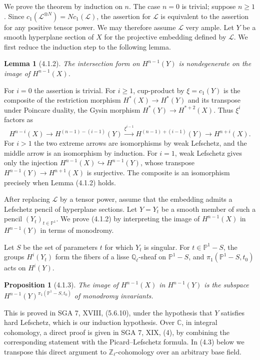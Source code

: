 \documentclass[11pt]{article}
\newtheorem{proposition}{Proposition}
\newtheorem{lemma}{Lemma}
\theoremstyle{remark}
\begin{document}
We prove the theorem by induction on $n$. The case $n=0$ is trivial; suppose $n\geq 1$. Since $c_1(\mathcal L^{\otimes N})=N c_1(\mathcal L)$, the assertion for $\mathcal L$ is equivalent to the assertion for any positive tensor power. We may therefore assume $\mathcal L$ very ample. Let $Y$ be a smooth hyperplane section of $X$ for the projective embedding defined by $\mathcal L$. We first reduce the induction step to the following lemma.

\begin{lemma}[4.1.2]
The intersection form on $H^{n-1}(Y)$ is nondegenerate on the image of $H^{n-1}(X)$.
\end{lemma}

For $i=0$ the assertion is trivial. For $i\geq 1$, cup-product by $\xi=c_1(Y)$ is the composite of the restriction morphism $H^*(X)\to H^*(Y)$ and its transpose under Poincare duality, the Gysin morphism $H^*(Y)\to H^{*+2}(X)$. Thus $\xi^i$ factors as
\[
H^{n-i}(X)\longrightarrow H^{(n-1)-(i-1)}(Y)
 \xrightarrow{\xi^{i-1}}
H^{(n-1)+(i-1)}(Y)\longrightarrow H^{n+i}(X).
\]
For $i>1$ the two extreme arrows are isomorphisms by weak Lefschetz, and the middle arrow is an isomorphism by induction. For $i=1$, weak Lefschetz gives only the injection $H^{n-1}(X)\hookrightarrow H^{n-1}(Y)$, whose transpose $H^{n-1}(Y)\to H^{n+1}(X)$ is surjective. The composite is an isomorphism precisely when Lemma (4.1.2) holds.

After replacing $\mathcal L$ by a tensor power, assume that the embedding admits a Lefschetz pencil of hyperplane sections. Let $Y=Y_t$ be a smooth member of such a pencil $(Y_t)_{t\in\mathbb P^1}$. We prove (4.1.2) by interpreting the image of $H^{n-1}(X)$ in $H^{n-1}(Y)$ in terms of monodromy.

Let $S$ be the set of parameters $t$ for which $Y_t$ is singular. For $t\in\mathbb P^1-S$, the groups $H^i(Y_t)$ form the fibers of a lisse $\mathbb Q_\ell$-sheaf on $\mathbb P^1-S$, and $\pi_1(\mathbb P^1-S,t_0)$ acts on $H^i(Y)$.

\begin{proposition}[4.1.3]
The image of $H^{n-1}(X)$ in $H^{n-1}(Y)$ is the subspace $H^{n-1}(Y)^{\pi_1(\mathbb P^1-S,t_0)}$ of monodromy invariants.
\end{proposition}

This is proved in SGA 7, XVIII, (5.6.10), under the hypothesis that $Y$ satisfies hard Lefschetz, which is our induction hypothesis. Over $\mathbb C$, in integral cohomology, a direct proof is given in SGA 7, XIX, (4), by combining the corresponding statement with the Picard--Lefschetz formula. In (4.3) below we transpose this direct argument to $\mathbb Z_\ell$-cohomology over an arbitrary base field.
\end{document}
